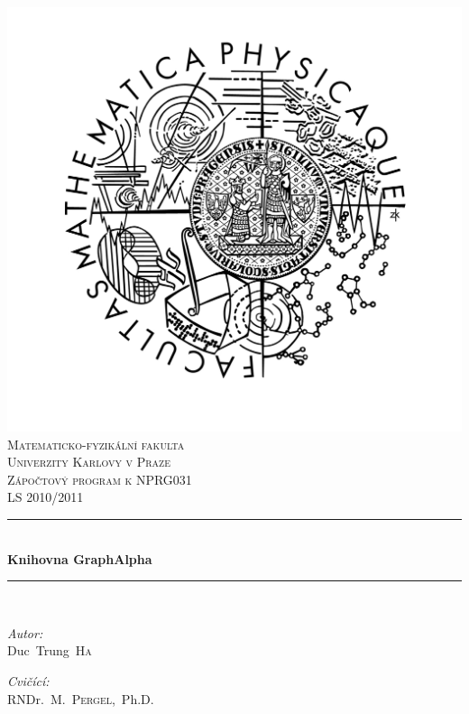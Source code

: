 \documentclass[11pt,a4paper]{article}
\newcommand{\HRule}{\rule{\linewidth}{0.5mm}}
\begin{document}
\begin{titlepage}
\begin{center}
\includegraphics[viewport=180 50 100 100,scale=0.5]{./logo_mff.jpg}\\[1cm]    

\textsc{\LARGE Matematicko-fyzikální fakulta\\[0.1cm]
Univerzity Karlovy v Praze}\\[1.5cm]

\textsc{\Large Zápočtový program k NPRG031\\ LS 2010/2011}\\[0.5cm]


\HRule \\[0.4cm]
{ \huge \bfseries Knihovna GraphAlpha}\\[0.4cm]

\HRule \\[1.5cm]

\begin{minipage}{0.4\textwidth}
\begin{flushleft} \large
\emph{Autor:}\\
Duc~Trung~\textsc{Ha}
\end{flushleft}
\end{minipage}
\begin{minipage}{0.4\textwidth}
\begin{flushright} \large
\emph{Cvičící:} \\
RNDr.~M.~\textsc{Pergel},~Ph.D.
\end{flushright}
\end{minipage}


\end{center}
\end{titlepage}
\end{document}
